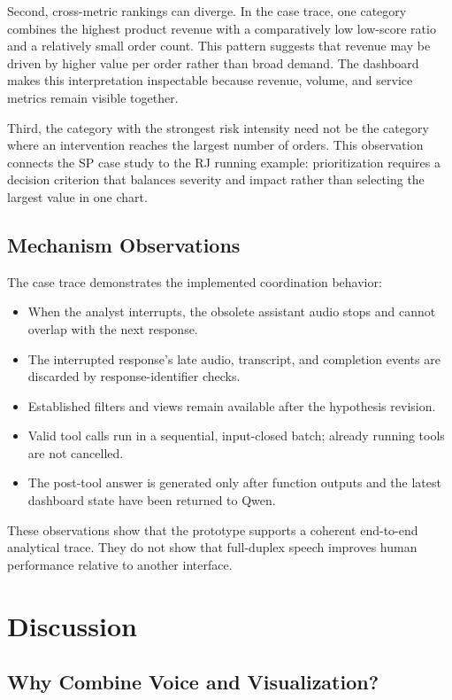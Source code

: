 \documentclass[journal]{IEEEtran}
\begin{document}
Second, cross-metric rankings can diverge. In the case trace, one category combines the highest product revenue with a comparatively low low-score ratio and a relatively small order count. This pattern suggests that revenue may be driven by higher value per order rather than broad demand. The dashboard makes this interpretation inspectable because revenue, volume, and service metrics remain visible together.

Third, the category with the strongest risk intensity need not be the category where an intervention reaches the largest number of orders. This observation connects the SP case study to the RJ running example: prioritization requires a decision criterion that balances severity and impact rather than selecting the largest value in one chart.

\subsection{Mechanism Observations}

The case trace demonstrates the implemented coordination behavior:

\begin{itemize}
\item When the analyst interrupts, the obsolete assistant audio stops and cannot overlap with the next response.
\item The interrupted response's late audio, transcript, and completion events are discarded by response-identifier checks.
\item Established filters and views remain available after the hypothesis revision.
\item Valid tool calls run in a sequential, input-closed batch; already running tools are not cancelled.
\item The post-tool answer is generated only after function outputs and the latest dashboard state have been returned to Qwen.
\end{itemize}

These observations show that the prototype supports a coherent end-to-end analytical trace. They do not show that full-duplex speech improves human performance relative to another interface.

\section{Discussion}
\label{sec:discussion}

\subsection{Why Combine Voice and Visualization?}
\end{document}
